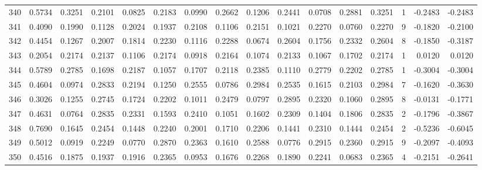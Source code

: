 \begin{tabular}{lrrrrrrrrrrrrrrr}
340 &      0.5734 &  0.3251 &  0.2101 &  0.0825 &  0.2183 &  0.0990 &  0.2662 &  0.1206 &  0.2441 &  0.0708 &   0.2881 &     0.3251 &      1 &                   -0.2483 &                    -0.2483 \\
341 &      0.4090 &  0.1990 &  0.1128 &  0.2024 &  0.1937 &  0.2108 &  0.1106 &  0.2151 &  0.1021 &  0.2270 &   0.0760 &     0.2270 &      9 &                   -0.1820 &                    -0.2100 \\
342 &      0.4454 &  0.1267 &  0.2007 &  0.1814 &  0.2230 &  0.1116 &  0.2288 &  0.0674 &  0.2604 &  0.1756 &   0.2332 &     0.2604 &      8 &                   -0.1850 &                    -0.3187 \\
343 &      0.2054 &  0.2174 &  0.2137 &  0.1106 &  0.2174 &  0.0918 &  0.2164 &  0.1074 &  0.2133 &  0.1067 &   0.1702 &     0.2174 &      1 &                    0.0120 &                     0.0120 \\
344 &      0.5789 &  0.2785 &  0.1698 &  0.2187 &  0.1057 &  0.1707 &  0.2118 &  0.2385 &  0.1110 &  0.2779 &   0.2202 &     0.2785 &      1 &                   -0.3004 &                    -0.3004 \\
345 &      0.4604 &  0.0974 &  0.2833 &  0.2194 &  0.1250 &  0.2555 &  0.0786 &  0.2984 &  0.2535 &  0.1615 &   0.2103 &     0.2984 &      7 &                   -0.1620 &                    -0.3630 \\
346 &      0.3026 &  0.1255 &  0.2745 &  0.1724 &  0.2202 &  0.1011 &  0.2479 &  0.0797 &  0.2895 &  0.2320 &   0.1060 &     0.2895 &      8 &                   -0.0131 &                    -0.1771 \\
347 &      0.4631 &  0.0764 &  0.2835 &  0.2331 &  0.1593 &  0.2410 &  0.1051 &  0.1602 &  0.2309 &  0.1404 &   0.1806 &     0.2835 &      2 &                   -0.1796 &                    -0.3867 \\
348 &      0.7690 &  0.1645 &  0.2454 &  0.1448 &  0.2240 &  0.2001 &  0.1710 &  0.2206 &  0.1441 &  0.2310 &   0.1444 &     0.2454 &      2 &                   -0.5236 &                    -0.6045 \\
349 &      0.5012 &  0.0919 &  0.2249 &  0.0770 &  0.2870 &  0.2363 &  0.1610 &  0.2588 &  0.0776 &  0.2915 &   0.2360 &     0.2915 &      9 &                   -0.2097 &                    -0.4093 \\
350 &      0.4516 &  0.1875 &  0.1937 &  0.1916 &  0.2365 &  0.0953 &  0.1676 &  0.2268 &  0.1890 &  0.2241 &   0.0683 &     0.2365 &      4 &                   -0.2151 &                    -0.2641 \\

\end{tabular}
